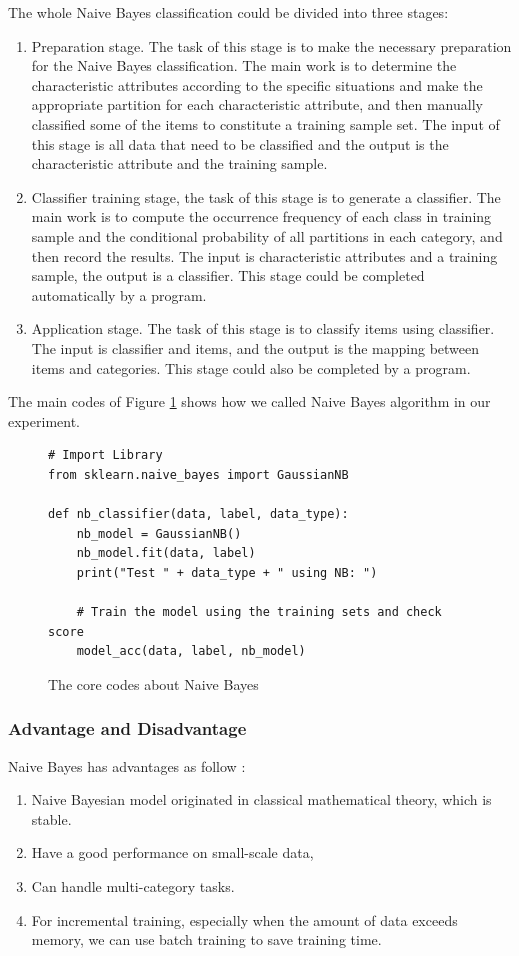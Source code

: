 \documentclass[sigconf]{acmart}
\begin{document}
The whole Naive Bayes classification could be divided into three stages:
\begin{enumerate}
    \item Preparation stage. The task of this stage is to make the necessary preparation for the Naive Bayes classification. The main work is to determine the characteristic attributes according to the specific situations and make the appropriate partition for each characteristic attribute, and then manually classified some of the items to constitute a training sample set. The input of this stage is all data that need to be classified and the output is the characteristic attribute and the training sample.
    \item Classifier training stage, the task of this stage is to generate a classifier. The main work is to compute the occurrence frequency of each class in training sample and the conditional probability of all partitions in each category, and then record the results. The input is characteristic attributes and a training sample, the output is a classifier. This stage could be completed automatically by a program.
    \item Application stage. The task of this stage is to classify items using classifier. The input is classifier and items, and the output is the mapping between items and categories. This stage could also be completed by a program.
\end{enumerate}

The main codes of Figure \ref{fig:nb} shows how we called Naive Bayes algorithm in our experiment.

\begin{figure}[htb]
\centering
\begin{lstlisting}
# Import Library
from sklearn.naive_bayes import GaussianNB

def nb_classifier(data, label, data_type):
    nb_model = GaussianNB()
    nb_model.fit(data, label)
    print("Test " + data_type + " using NB: ")
    
    # Train the model using the training sets and check score
    model_acc(data, label, nb_model)
\end{lstlisting}
\caption{The core codes about Naive Bayes}\label{fig:nb}
\end{figure}

\subsubsection{Advantage and Disadvantage}
Naive Bayes has advantages as follow \cite{NB}:
\begin{enumerate}
    \item Naive Bayesian model originated in classical mathematical theory, which is stable.
    \item Have a good performance on small-scale data,
    \item Can handle multi-category tasks.
    \item For incremental training, especially when the amount of data exceeds memory, we can use batch training to save training time.
\end{enumerate}
\end{document}
